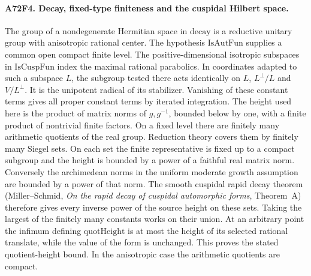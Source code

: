 \paragraph{A72F4. Decay, fixed-type finiteness and the cuspidal Hilbert space.}
The group of a nondegenerate Hermitian space in $\mathrm{decay}$ is
a reductive unitary group with anisotropic rational center. The
hypothesis $\mathrm{IsAutFun}$ supplies a common open compact
finite level. The positive-dimensional isotropic subspaces in
$\mathrm{IsCuspFun}$ index the maximal rational parabolics.
In coordinates adapted to such a subspace $L$, the subgroup tested
there acts identically on $L$, $L^\perp/L$ and $V/L^\perp$.
It is the unipotent radical of its stabilizer. Vanishing of these
constant terms gives all proper constant terms by iterated
integration. The height used here is the product of matrix norms
of $g,g^{-1}$, bounded below by one, with a finite product of
nontrivial finite factors. On a fixed level there are finitely many
arithmetic quotients of the real group. Reduction theory covers
them by finitely many Siegel sets. On each set the finite
representative is fixed up to a compact subgroup and the height
is bounded by a power of a faithful real matrix norm. Conversely
the archimedean norms in the uniform moderate growth assumption
are bounded by a power of that norm. The smooth cuspidal rapid
decay theorem (Miller--Schmid, \emph{On the rapid decay of cuspidal
automorphic forms}, Theorem~A) therefore gives every inverse power
of the source height on these sets. Taking the largest of the
finitely many constants works on their union. At an arbitrary
point the infimum defining $\mathrm{quotHeight}$ is at most the
height of its selected rational translate, while the value of the
form is unchanged. This proves the stated quotient-height bound.
In the anisotropic case the arithmetic quotients are compact.

